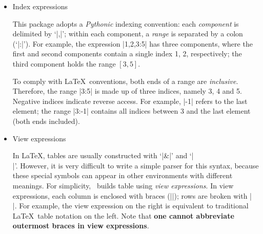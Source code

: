 \documentclass{l3doc}
\newcommand{\thispkg}{\pkg{luaprogtable}}
\begin{document}
\begin{documentation}
\begin{itemize}
\begin{center}
    \ExplSyntaxOff
\end{center}

\item \hypertarget{index-expr}{Index expressions}

This package adopts a \emph{Pythonic} indexing convention: each \emph{component} is delimited by `|,|'; within each component, a \emph{range} is separated by a colon (`|:|'). For example, the expression |1,2,3:5| has three components, where the first and second components contain a single index 1, 2, respectively; the third component holds the range $[3, 5]$.

To comply with \LaTeX\ conventions, both ends of a range are \emph{inclusive}. Therefore, the range |3:5| is made up of three indices, namely 3, 4 and 5. Negative indices indicate reverse access. For example, |-1| refers to the last element; the range |3:-1| contains all indices between 3 and the last element (both ends included).


\item \hypertarget{view-expr}{View expressions}

In \LaTeX , tables are usually constructed with `|&|' and `|\\|'. However, it is very difficult to write a simple parser for this syntax, because these special symbols can appear in other environments with different meanings. For simplicity, \thispkg\ builds table using \emph{view expressions}. In view expressions, each column is enclosed with braces (|{}|); rows are broken with |\\|. For example, the view expression on the right is equivalent to traditional \LaTeX\ table notation on the left. Note that \textbf{one cannot abbreviate outermost braces in view expressions}.


\end{itemize}
\end{documentation}
\end{document}
